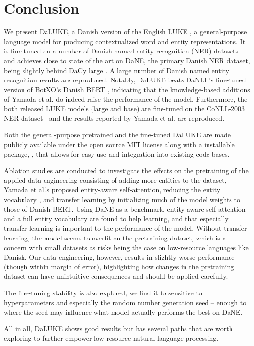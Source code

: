 \documentclass[main.tex]{subfiles}
\begin{document}
\chapter{Conclusion}
We present DaLUKE, a Danish version of the English LUKE \cite{yamada2020luke}, a general-purpose language model for producing contextualized word and entity representations.
It is fine-tuned on a number of Danish named entity recognition (NER) datasets and achieves close to state of the art on DaNE, the primary Danish NER dataset, being slightly behind DaCy large \cite{enevoldsen2020dacy}.
A large number of Danish named entity recognition results are reproduced.
Notably, DaLUKE beats DaNLP's fine-tuned version of BotXO's Danish BERT \cite{danlp2021, botxo2019dabert}, indicating that the knowledge-based additions of Yamada et al. \cite{yamada2020luke} do indeed raise the performance of the model.
Furthermore, the both released LUKE models (large and base) are fine-tuned on the CoNLL-2003 NER dataset \cite{tjang2003conll}, and the results reported by Yamada et al. are reproduced.

Both the general-purpose pretrained and the fine-tuned DaLUKE are made publicly available under the open source MIT license \cite{mitlicense} along with a  installable package, , that allows for easy use and integration into existing code bases.

Ablation studies are conducted to investigate the effects on the pretraining of the applied data engineering consisting of adding more entities to the dataset, Yamada et al.'s proposed entity-aware self-attention, reducing the entity vocabulary \cite{yamada2020luke}, and transfer learning by initializing much of the model weights to those of Danish BERT.
Using DaNE as a benchmark, entity-aware self-attention and a full entity vocabulary are found to help learning, and that especially transfer learning is important to the performance of the model.
Without transfer learning, the model seems to overfit on the pretraining dataset, which is a concern with small datasets as risks being the case on low-resource languages like Danish.
Our data-engineering, however, results in slightly worse performance (though within margin of error), highlighting how changes in the pretraining dataset can have unintuitive consequences and should be applied carefully.

The fine-tuning stability is also explored; we find it to sensitive to hyperparameters and especially the random number generation seed -- enough to where the seed may influence what model actually performs the best on DaNE.

All in all, DaLUKE shows good results but has several paths that are worth exploring to further empower low resource natural language processing.
\end{document}
